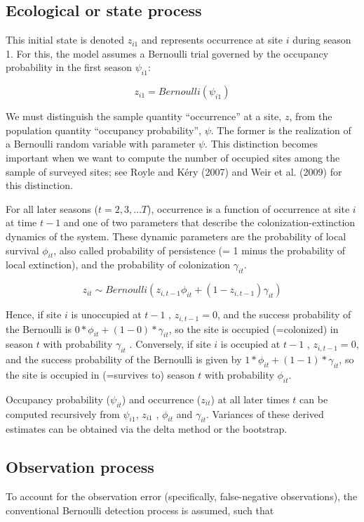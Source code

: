 \documentclass[12pt]{article}
\begin{document}
\subsection{Ecological or state process}
This initial state is denoted $z_{i1}$ and represents occurrence at
site $i$ during season 1.
For this, the model assumes a Bernoulli trial governed by the
occupancy probability in the first season $\psi_{i1}$:

\[
 z_{i1} = Bernoulli(\psi_{i1})
\]

We must distinguish the sample quantity ``occurrence'' at a site, $z$,
from the population quantity ``occupancy probability'', $\psi$.
The former is the realization of a Bernoulli random variable with
parameter $\psi$.
This distinction becomes important when we want to compute the number
of occupied sites among the sample of surveyed sites;
see Royle and K\'{e}ry (2007) and Weir et al. (2009) for this
distinction.

For all later seasons ($t = 2, 3, \ldots T$), occurrence is a function
of occurrence at site $i$ at time $t-1$ and one of two parameters that
describe the colonization-extinction dynamics of the system.
These dynamic parameters are the probability of local survival
$\phi_{it}$, also called probability of persistence (= 1 minus the
probability of local extinction),
and the probability of colonization $\gamma_{it}$.

\[
 z_{it} \sim Bernoulli(z_{i,t-1} \phi_{it} + (1-z_{i,t-1}) \gamma_{it})
\]

Hence, if site $i$ is unoccupied at $t-1$ , $z_{i,t-1}=0$, and the
success probability of the Bernoulli is
$0*\phi_{it} + (1-0) * \gamma_{it}$, so the site is occupied
(=colonized) in season $t$ with probability $\gamma_{it}$
. Conversely, if site $i$ is occupied at $t-1$ , $z_{i,t-1}=0$, and
the success probability of the Bernoulli is given by $1*\phi_{it} +
(1-1) * \gamma_{it}$, so the site is occupied in (=survives to) season
$t$ with probability $\phi_{it}$.

Occupancy probability ($\psi_{it}$) and occurrence ($z_{it}$) at all
later times $t$ can be computed recursively from  $\psi_{i1}$,
$z_{i1}$ , $\phi_{it}$  and  $\gamma_{it}$.
Variances of these derived estimates can be obtained via the delta
method or the bootstrap.


\subsection{Observation process}
To account for the observation error (specifically, false-negative
observations), the conventional Bernoulli detection process is
assumed, such that
\end{document}

